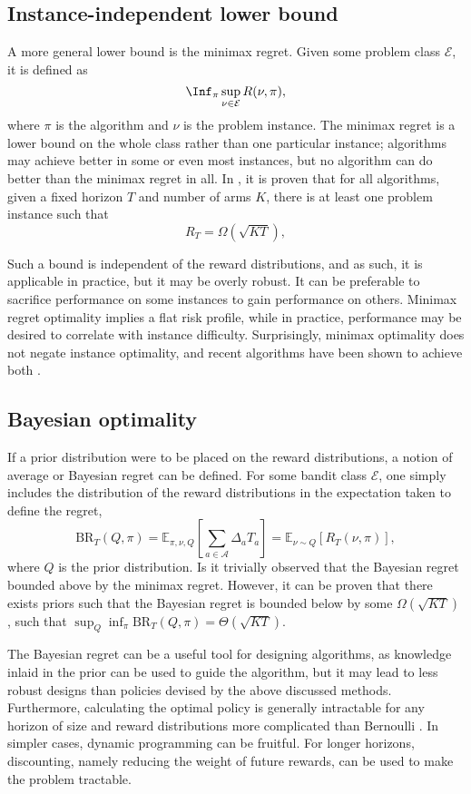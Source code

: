 \subsection{Instance-independent lower bound}
A more general lower bound is the minimax regret.
Given some problem class $\mathcal{E}$, it is defined as
\begin{equation}
    \Inf_{\pi} \sup_{\nu \in \mathcal{E}} R(\nu, \pi),
\end{equation}
where $\pi$ is the algorithm and $\nu$ is the problem instance.
The minimax regret is a lower bound on the whole class rather than one particular instance; algorithms may achieve better in some or even most instances, but no algorithm can do better than the minimax regret in all.
In \autocite{auer2002a}, it is proven that for all algorithms, given a fixed horizon $T$ and number of arms $K$, there is at least one problem instance such that
\begin{equation}
    R_T = \Omega(\sqrt{KT}),
\end{equation}

Such a bound is independent of the reward distributions, and as such, it is applicable in practice, but it may be overly robust.
It can be preferable to sacrifice performance on some instances to gain performance on others.
Minimax regret optimality implies a flat risk profile, while in practice, performance may be desired to correlate with instance difficulty.
Surprisingly, minimax optimality does not negate instance optimality, and recent algorithms have been shown to achieve both \autocite{menard2017, jin2020}.


\subsection{Bayesian optimality}
If a prior distribution were to be placed on the reward distributions, a notion of average or Bayesian regret can be defined.
For some bandit class $\mathcal{E}$, one simply includes the distribution of the reward distributions in the expectation taken to define the regret,
\begin{equation}
    \text{BR}_T(Q, \pi)
    = \mathbb{E}_{\pi, \nu, Q} \left[ \sum_{a \in \mathcal{A}} \Delta_a T_a \right]
    = \mathbb{E}_{\nu \sim Q} \left[R_T(\nu, \pi) \right],
\end{equation}
where $Q$ is the prior distribution.
Is it trivially observed that the Bayesian regret bounded above by the minimax regret.
However, it can be proven that there exists priors such that the Bayesian regret is bounded below by some $\Omega(\sqrt{KT})$ \cite{lattimore2020}, such that $\sup_{Q} \inf_{\pi} \text{BR}_T(Q, \pi) = \Theta(\sqrt{KT})$.

The Bayesian regret can be a useful tool for designing algorithms, as knowledge inlaid in the prior can be used to guide the algorithm, but it may lead to less robust designs than policies devised by the above discussed methods.
Furthermore, calculating the optimal policy is generally intractable for any horizon of size and reward distributions more complicated than Bernoulli \cite{lattimore2020}.
In simpler cases, dynamic programming can be fruitful.
For longer horizons, discounting, namely reducing the weight of future rewards, can be used to make the problem tractable.